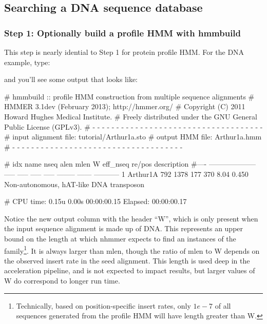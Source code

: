 \subsection{Searching a DNA sequence database}

\subsubsection{Step 1: Optionally build a profile HMM with hmmbuild}

This step is nearly idential to Step 1 for protein profile HMM. For the DNA
example, type:


and you'll see some output that looks like:

\begin{sreoutput}
# hmmbuild :: profile HMM construction from multiple sequence alignments
# HMMER 3.1dev (February 2013); http://hmmer.org/
# Copyright (C) 2011 Howard Hughes Medical Institute.
# Freely distributed under the GNU General Public License (GPLv3).
# - - - - - - - - - - - - - - - - - - - - - - - - - - - - - - - - - - - -
# input alignment file:             tutorial/Arthur1a.sto
# output HMM file:                  Arthur1a.hmm
# - - - - - - - - - - - - - - - - - - - - - - - - - - - - - - - - - - - -

# idx name                  nseq  alen  mlen     W eff_nseq re/pos description
#---- -------------------- ----- ----- ----- ----- -------- ------ -----------
1     Arthur1A               792  1378   177   370     8.04  0.450 Non-autonomous, hAT-like DNA transposon

# CPU time: 0.15u 0.00s 00:00:00.15 Elapsed: 00:00:00.17
\end{sreoutput}

Notice the new output column with the header ``W'', which is only present when
the input sequence alignment is made up of DNA. This represents an upper bound
on the length at which nhmmer expects to find an instances of the 
family\footnote{Technically, based on position-specific insert rates, only
$1e-7$ of all sequences generated from the profile HMM will have length 
greater than W.}. 
It is always larger than mlen, though the ratio of mlen to W depends on the
observed insert rate in the seed alignment. This length is used deep in the
acceleration pipeline, and is not expected to impact results, but larger values
of W do correspond to longer run time.



